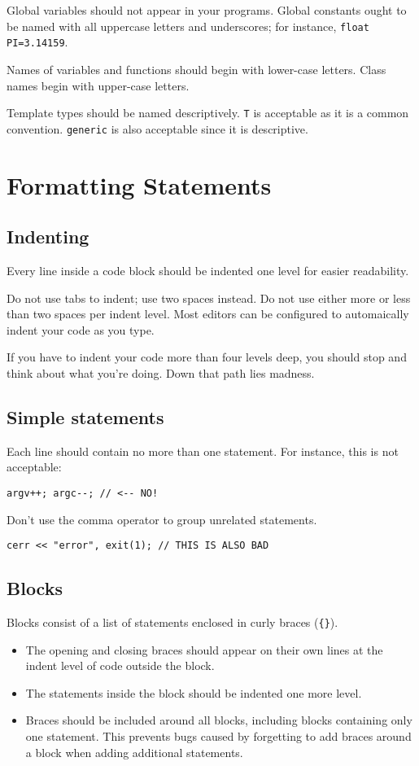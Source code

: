 \documentclass{article}
\newcommand{\code}[1]{\texttt{\colorbox{gray!30}{#1}}}
\begin{document}
Global variables should not appear in your programs.
Global constants ought to be named with all uppercase letters and underscores; for instance, \code{float PI=3.14159}.

Names of variables and functions should begin with lower-case letters.
Class names begin with upper-case letters.

Template types should be named descriptively.
\code{T} is acceptable as it is a common convention.
\code{generic} is also acceptable since it is descriptive.

\section{Formatting Statements}
\subsection{Indenting}
Every line inside a code block should be indented one level for easier readability.

Do not use tabs to indent; use two spaces instead.
Do not use either more or less than two spaces per indent level.
Most editors can be configured to automaically indent your code as you type.

If you have to indent your code more than four levels deep, you should stop and think about what you're doing.
Down that path lies madness.

\subsection{Simple statements}
Each line should contain no more than one statement.
For instance, this is not acceptable:
\begin{lstlisting}
argv++; argc--; // <-- NO!
\end{lstlisting}

Don't use the comma operator to group unrelated statements.
\begin{lstlisting}
cerr << "error", exit(1); // THIS IS ALSO BAD
\end{lstlisting}

\subsection{Blocks}
Blocks consist of a list of statements enclosed in curly braces (\code{\{\}}).
\begin{itemize}
	\item The opening and closing braces should appear on their own lines at the indent level of code outside the block.
	\item The statements inside the block should be indented one more level.
	\item Braces should be included around all blocks, including blocks containing only one statement.
		This prevents bugs caused by forgetting to add braces around a block when adding additional statements.
\end{itemize}
\end{document}
